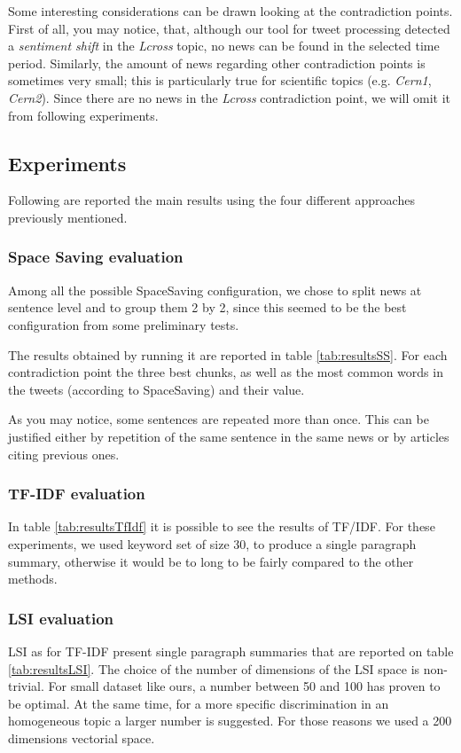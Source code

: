 Some interesting considerations can be drawn looking at the contradiction points.
First of all, you may notice, that, although our tool for tweet processing detected a \emph{sentiment
shift} in the \emph{Lcross} topic, no news can be found in the selected time period.
Similarly, the amount of news regarding other contradiction points is sometimes
very small; this is particularly true for scientific topics (e.g. \emph{Cern1},
\emph{Cern2}).
Since there are no news in the \emph{Lcross} contradiction point, we will omit it from following
experiments.

\subsection*{Experiments}
Following are reported the main results using the four different approaches previously mentioned.
\subsubsection*{Space Saving evaluation}
Among all the possible SpaceSaving configuration, we chose to split news at
sentence level and to group them 2 by 2, since this seemed to be the best
configuration from some preliminary tests.

The results obtained by running it are reported in table \ref{tab:resultsSS}. For
each contradiction point the three best chunks, as well as the most
common words in the tweets (according to SpaceSaving) and their value.

As you may notice, some sentences are repeated more than once. This can be
justified either by repetition of the same sentence in the same news or by
articles citing previous ones.

\subsubsection*{TF-IDF evaluation}
In table \ref{tab:resultsTfIdf} it is possible to see the results of TF/IDF. For these experiments, we used keyword set of size 30, to produce a single paragraph summary, otherwise it would be to long to be fairly compared to the other methods.

\subsubsection*{LSI evaluation}
LSI as for TF-IDF present single paragraph summaries that are reported on table \ref{tab:resultsLSI}. The choice of the number of dimensions of the LSI space is non-trivial. For small dataset like ours, a number between 50 and 100 has proven to be optimal\cite{LSA2}. At the same time, for a more specific discrimination in an homogeneous topic a larger number is suggested. For those reasons we used a 200 dimensions vectorial space.

